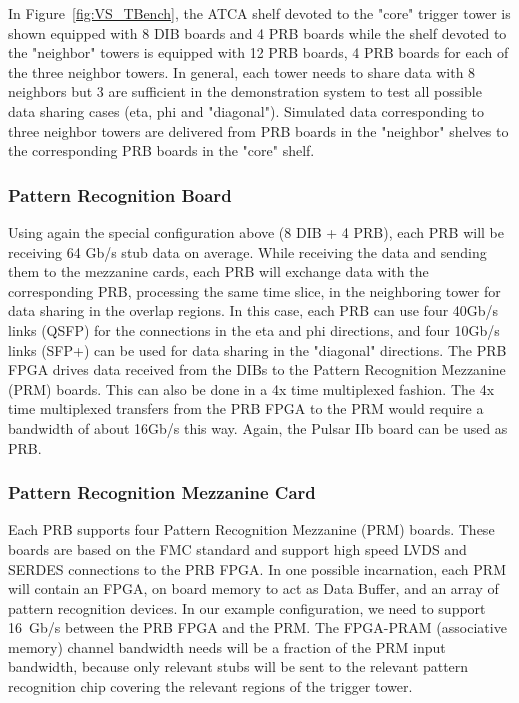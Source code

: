 \noindent In Figure~\ref{fig:VS_TBench}, the ATCA shelf devoted to the "core" trigger tower is shown equipped with 8 DIB boards and 4 PRB boards while the shelf devoted to the "neighbor" towers is equipped with 12 PRB boards, 4 PRB boards for each of the three neighbor towers. In general, each tower needs to share data with 8 neighbors but 3 are sufficient in the demonstration system to test all possible data sharing cases (eta, phi and "diagonal"). Simulated data corresponding to three neighbor towers are delivered from PRB boards in the "neighbor" shelves to the corresponding PRB boards in the "core" shelf.

\subsubsection{Pattern Recognition Board}

\noindent Using again the special configuration above (8 DIB + 4 PRB), each PRB will be receiving 64 Gb/s stub data on average. While receiving the data and sending them to the mezzanine cards, each PRB will exchange data with the corresponding PRB, processing the same time slice, in the neighboring tower for data sharing in the overlap regions. In this case, each PRB can use four 40Gb/s links (QSFP) for the connections in the eta and phi directions, and four 10Gb/s links (SFP+) can be used for data sharing in the "diagonal" directions. The PRB FPGA drives data received from the DIBs to the Pattern Recognition Mezzanine (PRM) boards. This can also be done in a 4x time multiplexed fashion. The 4x time multiplexed transfers from the PRB FPGA to the PRM would require a bandwidth of about 16Gb/s this way. Again, the Pulsar IIb board can be used as PRB. 

 


\subsubsection{Pattern Recognition Mezzanine Card}

\noindent Each PRB supports four Pattern Recognition Mezzanine (PRM) boards. These boards are based on the FMC standard and support high speed LVDS and SERDES connections to the PRB FPGA. In one possible incarnation, each PRM will contain an FPGA, on board memory to act as Data Buffer, and an array of pattern recognition devices. In our example configuration, we need to support 16~Gb/s between the PRB FPGA and the PRM. The FPGA-PRAM (associative memory) channel bandwidth needs will be a fraction of the PRM input bandwidth, because only relevant stubs will be sent to the relevant pattern recognition chip covering the relevant regions of the trigger tower.


